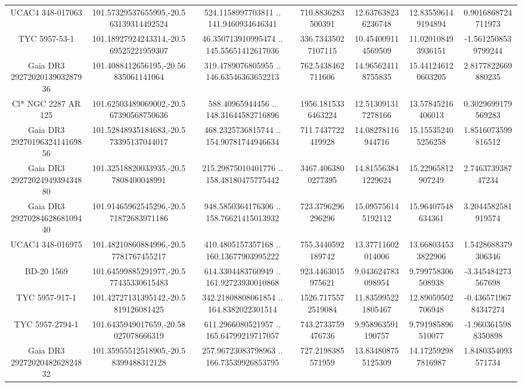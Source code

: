 \begin{table}
\begin{tabular}{ccccccc}
UCAC4 348-017063 & 101.57329537655995,-20.563139314492524 & 524.1158997703811 .. 141.9460934646341 & 710.8836283500391 & 12.637638236236748 & 12.835596149194894 & 0.9016868724711973 \\
TYC 5957-53-1 & 101.18927924243314,-20.569525221959307 & 46.350713910995474 .. 145.55651412617036 & 336.73435027107115 & 10.454009114569509 & 11.020108493936151 & -1.5612508539799244 \\
Gaia DR3 2927202013903287936 & 101.4088412656195,-20.56835061141064 & 319.4789076805955 .. 146.63546363652213 & 762.5438462711606 & 14.965624118755835 & 15.441246120603205 & 2.8177822669880235 \\
Cl* NGC 2287     AR     125 & 101.62503489069002,-20.567390568750636 & 588.40965944456 .. 148.31644582716896 & 1956.1815336463224 & 12.513091317278166 & 13.57845216406013 & 0.3029699179569283 \\
Gaia DR3 2927019632414169856 & 101.52848935184683,-20.573395137044017 & 468.2325736815744 .. 154.90781744946634 & 711.7437722419928 & 14.08278116944716 & 15.155352405256258 & 1.8516073599816512 \\
Gaia DR3 2927202494939434880 & 101.32518820033935,-20.57808400048991 & 215.29875010401776 .. 158.48180475775442 & 3467.4063800277395 & 14.815563841229624 & 15.22965812907249 & 2.746373938747234 \\
Gaia DR3 2927028462868109440 & 101.91465962545296,-20.571872683971186 & 948.5850364176306 .. 158.76621415013932 & 723.3796296296296 & 15.095756145192112 & 15.96407548634361 & 3.2044582581919574 \\
UCAC4 348-016975 & 101.48210860884996,-20.57781767455217 & 410.4805157357168 .. 160.13677903995222 & 755.3440592189742 & 13.37711602014006 & 13.668034533822906 & 1.5428688379306346 \\
BD-20  1569 & 101.64599885291977,-20.577435330615483 & 614.3304483760949 .. 161.92723930010868 & 923.4463015975621 & 9.043624783098954 & 9.799758306508938 & -3.345484273567698 \\
TYC 5957-917-1 & 101.42727131395142,-20.5819126081425 & 342.21808808061854 .. 164.8382022301514 & 1526.7175572519084 & 11.835995221805467 & 12.89059502706948 & -0.43657196784347274 \\
TYC 5957-2794-1 & 101.6435949017659,-20.58027078666319 & 611.2966080521957 .. 165.64799219717057 & 743.2733759476736 & 9.958963591190757 & 9.791985896510077 & -1.9603615988350898 \\
Gaia DR3 2927202048262824832 & 101.35955512518905,-20.58399488312128 & 257.96723083798963 .. 166.73539926853795 & 727.2198385571959 & 13.834808755125309 & 14.172592987816987 & 1.8480354093571734 \\

\end{tabular}
\end{table}
